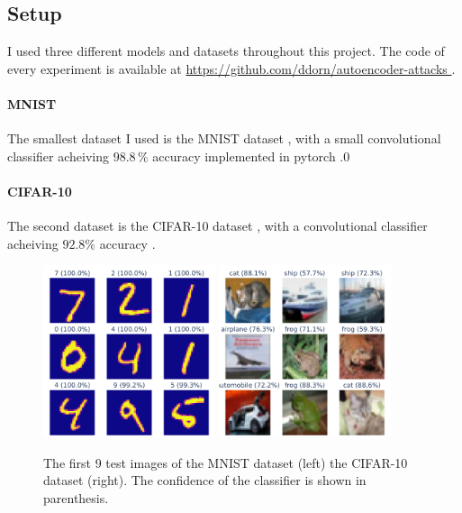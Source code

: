 \documentclass[]{scrarticle}
\begin{document}
\subsection{Setup}
I used three different models and datasets throughout this project.
The code of every experiment is available at \url{
  https://github.com/ddorn/autoencoder-attacks
}.

\paragraph{MNIST}
The smallest dataset I used is the MNIST dataset \cite{LeCun1998GradientbasedLA},
with a small convolutional classifier acheiving $98.8\,\%$ accuracy implemented in pytorch \cite{tuomaso2022trainmnistfast}.0

\paragraph{CIFAR-10}
The second dataset is the CIFAR-10 dataset \cite{Krizhevsky2009LearningML},
with a convolutional classifier acheiving $92.8 \%$ accuracy \cite{999912022cifar10fastsimple}.

\begin{figure}[h]
  \centering
  \includegraphics[width=0.45\textwidth]{images/sample_MNIST.png}
  \includegraphics[width=0.45\textwidth]{images/sample_CIFAR10.png}
  \caption{
    The first 9 test images of
    the MNIST dataset (left)
    the CIFAR-10 dataset (right).
    The confidence of the classifier is shown in parenthesis.}
  \label{fig:mnist_cifar10_samples}
\end{figure}
\end{document}
